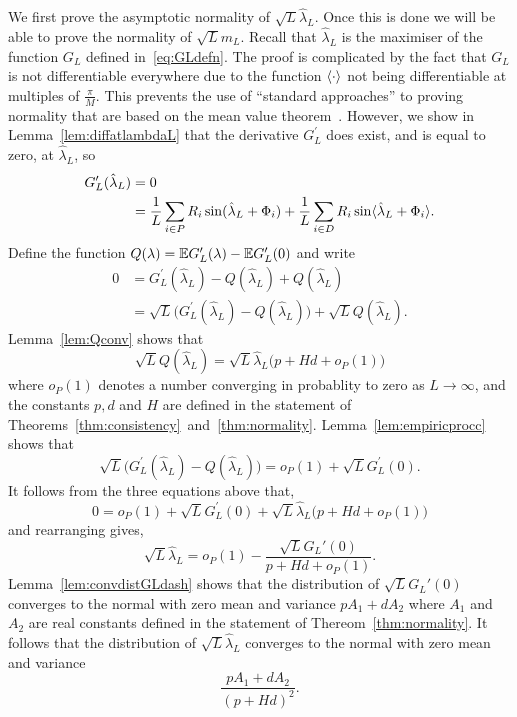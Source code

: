 \documentclass[journal]{IEEEtran}
\begin{document}
We first prove the asymptotic normality of $\sqrt{L} \hat{\lambda}_L$.  Once this is done we will be able to prove the normality of $\sqrt{L} m_L$.  Recall that $\hat{\lambda}_L$ is the maximiser of the function $G_L$ defined in~\eqref{eq:GLdefn}.  The proof is complicated by the fact that $G_L$ is not differentiable everywhere due to the function $\left\langle \cdot \right\rangle$ not being differentiable at multiples of $\tfrac{\pi}{M}$.  This prevents the use of ``standard approaches'' to proving normality that are based on the mean value theorem~\cite{vonMises_diff_stats_1947,vanDerVart1971_asymptotic_stats,Pollard_new_ways_clts_1986,Pollard_conv_stat_proc_1984,Pollard_asymp_empi_proc_1989}.  However, we show in Lemma~\ref{lem:diffatlambdaL} that the derivative $G_L^\prime$ does exist, and is equal to zero, at $\hat{\lambda}_L$, so
\begin{align*}
G_L^\prime(\hat{\lambda}_L) &= 0 \\
&= \frac{1}{L} \sum_{i \in P} R_i \sin(\hat{\lambda}_L + \Phi_i) + \frac{1}{L} \sum_{i \in D} R_i \sin\langle \hat{\lambda}_L + \Phi_i \rangle.
\end{align*}
Define the function $Q(\lambda) = {\mathbb E} G_L^\prime(\lambda) - {\mathbb E} G_L^\prime(0)$ and write
\begin{align*}
0 &= G_L^\prime(\hat{\lambda}_L) - Q(\hat{\lambda}_L) + Q(\hat{\lambda}_L) \\
&= \sqrt{L}\big( G_L^\prime(\hat{\lambda}_L) - Q(\hat{\lambda}_L) \big) + \sqrt{L}Q(\hat{\lambda}_L).
\end{align*}
Lemma~\ref{lem:Qconv} shows that
\[
\sqrt{L} Q(\hat{\lambda}_L) = \sqrt{L} \hat{\lambda}_L\big( p + Hd  + o_P(1) \big)
\]
where $o_P(1)$ denotes a number converging in probablity to zero as $L \rightarrow \infty$, and the constants $p,d$ and $H$ are defined in the statement of Theorems~\ref{thm:consistency}~and~\ref{thm:normality}.  Lemma~\ref{lem:empiricprocc} shows that
\[
\sqrt{L}\big( G_L^\prime(\hat{\lambda}_L) - Q(\hat{\lambda}_L) \big) = o_P(1) + \sqrt{L} G_L^\prime(0).
\]
It follows from the three equations above that,
\[
0 = o_P(1) + \sqrt{L}G_L^\prime(0) + \sqrt{L} \hat{\lambda}_L \big( p + Hd  + o_P(1) \big)
\]
and rearranging gives,
\[
\sqrt{L} \hat{\lambda}_L = o_P(1) - \frac{\sqrt{L}G_L'(0)}{p + Hd  + o_P(1)}.
\]
Lemma~\ref{lem:convdistGLdash} shows that the distribution of $\sqrt{L}G_L'(0)$ converges to the normal with zero mean and variance $pA_1 + dA_2$ where $A_1$ and $A_2$ are real constants defined in the statement of Thereom~\ref{thm:normality}.  It follows that the distribution of $\sqrt{L}\hat{\lambda}_L$ converges to the normal with zero mean and variance
\[
\frac{pA_1 + dA_2}{(p + Hd)^2}.
\]
 
\end{document}

